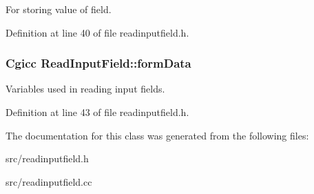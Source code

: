 For storing value of field. 



Definition at line 40 of file readinputfield.\-h.

\hypertarget{classReadInputField_a1e4ebac8979fd9b2771320d669fce5fc}{
\subsubsection[{form\-Data}]{\setlength{\rightskip}{0pt plus 5cm}Cgicc Read\-Input\-Field\-::form\-Data\hspace{0.3cm}{\ttfamily [protected]}}}\label{classReadInputField_a1e4ebac8979fd9b2771320d669fce5fc}


Variables used in reading input fields. 



Definition at line 43 of file readinputfield.\-h.



The documentation for this class was generated from the following files\-:\begin{DoxyCompactItemize}
\item 
src/readinputfield.\-h\item 
src/readinputfield.\-cc\end{DoxyCompactItemize}

